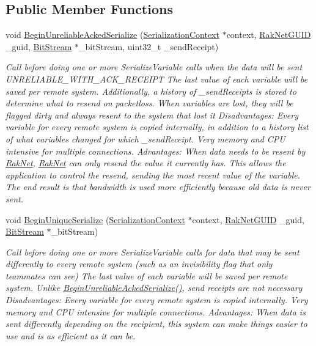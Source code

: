 \subsection*{Public Member Functions}
\begin{DoxyCompactItemize}
\item 
void \hyperlink{class_rak_net_1_1_variable_delta_serializer_ae755cec2f8482621b134f1537a818d98}{Begin\-Unreliable\-Acked\-Serialize} (\hyperlink{struct_rak_net_1_1_variable_delta_serializer_1_1_serialization_context}{Serialization\-Context} $\ast$context, \hyperlink{struct_rak_net_1_1_rak_net_g_u_i_d}{Rak\-Net\-G\-U\-I\-D} \-\_\-guid, \hyperlink{class_rak_net_1_1_bit_stream}{Bit\-Stream} $\ast$\-\_\-bit\-Stream, uint32\-\_\-t \-\_\-send\-Receipt)
\begin{DoxyCompactList}\small\item\em Call before doing one or more Serialize\-Variable calls when the data will be sent U\-N\-R\-E\-L\-I\-A\-B\-L\-E\-\_\-\-W\-I\-T\-H\-\_\-\-A\-C\-K\-\_\-\-R\-E\-C\-E\-I\-P\-T The last value of each variable will be saved per remote system. Additionally, a history of {\itshape \-\_\-send\-Receipts} is stored to determine what to resend on packetloss. When variables are lost, they will be flagged dirty and always resent to the system that lost it Disadvantages\-: Every variable for every remote system is copied internally, in addition to a history list of what variables changed for which {\itshape \-\_\-send\-Receipt}. Very memory and C\-P\-U intensive for multiple connections. Advantages\-: When data needs to be resent by \hyperlink{namespace_rak_net}{Rak\-Net}, \hyperlink{namespace_rak_net}{Rak\-Net} can only resend the value it currently has. This allows the application to control the resend, sending the most recent value of the variable. The end result is that bandwidth is used more efficiently because old data is never sent. \end{DoxyCompactList}\item 
void \hyperlink{class_rak_net_1_1_variable_delta_serializer_ad3c9911d1d42bd432d622c98097f14a3}{Begin\-Unique\-Serialize} (\hyperlink{struct_rak_net_1_1_variable_delta_serializer_1_1_serialization_context}{Serialization\-Context} $\ast$context, \hyperlink{struct_rak_net_1_1_rak_net_g_u_i_d}{Rak\-Net\-G\-U\-I\-D} \-\_\-guid, \hyperlink{class_rak_net_1_1_bit_stream}{Bit\-Stream} $\ast$\-\_\-bit\-Stream)
\begin{DoxyCompactList}\small\item\em Call before doing one or more Serialize\-Variable calls for data that may be sent differently to every remote system (such as an invisibility flag that only teammates can see) The last value of each variable will be saved per remote system. Unlike \hyperlink{class_rak_net_1_1_variable_delta_serializer_ae755cec2f8482621b134f1537a818d98}{Begin\-Unreliable\-Acked\-Serialize()}, send receipts are not necessary Disadvantages\-: Every variable for every remote system is copied internally. Very memory and C\-P\-U intensive for multiple connections. Advantages\-: When data is sent differently depending on the recipient, this system can make things easier to use and is as efficient as it can be. \end{DoxyCompactList}\item 

\end{DoxyCompactItemize}
